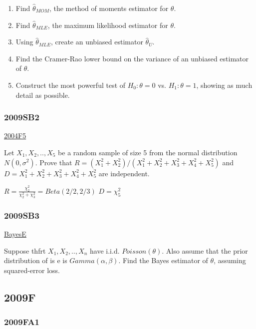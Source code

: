 \documentclass[10pt,twocolumn,portrait]{article}
\begin{document}
\begin{enumerate}
\def\labelenumi{(\alph{enumi})}
\item
  Find \(\hat\theta_{MOM}\), the method of moments estimator for
  \(\theta\).
\item
  Find \(\hat\theta_{MLE}\), the maximum likelihood estimator for
  \(\theta\).
\item
  Using \(\hat\theta_{MLE}\), create an unbiased estimator
  \(\hat\theta_{U}\).
\item
  Find the Cramer-Rao lower bound on the variance of an unbiased
  estimator of \(\theta\).
\item
  Construct the most powerful test of \(H_0:\theta=0\) vs.
  \(H_1:\theta=1\), showing as much detail as possible.
\end{enumerate}

\hypertarget{sb2}{%
\subsubsection{2009SB2}\label{sb2}}

\protect\hyperlink{f5-2}{2004F5}

Let \(X_1,X_2,..,X_5\) be a random sample of size 5 from the normal
distribution \(N(0,\sigma^2)\). Prove that
\(R=(X_1^2+ X_2^2)/(X_1^2+ X_2^2+X_3^2+ X_4^2+X_5^2)\) and
\(D=X_1^2+ X_2^2+X_3^2+ X_4^2+X_5^2\) are independent.

\(R=\frac{\chi_2^2}{\chi_2^2+\chi_3^2}=Beta(2/2,2/3)\) \(D=\chi_5^2\)

\hypertarget{sb3}{%
\subsubsection{2009SB3}\label{sb3}}

\protect\hyperlink{BayesE}{BayesE}

Suppose thfrt \(X_1,X_2,..,X_{n}\) have i.i.d. \(Poisson(\theta)\). Also
assume that the prior distribution of is e is \(Gamma(\alpha,\beta)\).
Find the Bayes estimator of \(\theta\), assuming squared-error loss.

\hypertarget{f-5}{%
\subsection{2009F}\label{f-5}}

\hypertarget{fa1}{%
\subsubsection{2009FA1}\label{fa1}}
\end{document}
